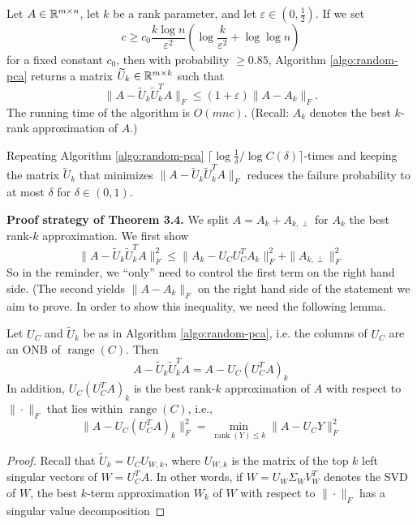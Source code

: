 \begin{theorem}
\begin{mdframed}
Let $A\in\mathbb{R}^{m\times n}$, let $k$ be a rank parameter, and let $\varepsilon\in (0,\frac{1}{2})$. If we set $$ c \geq c_0 \frac{k\log n}{\varepsilon^2} \left(
\log\frac{k}{\varepsilon^2} + \log \log n
\right)$$
for a fixed constant $c_0$, then with probability $\geq 0.85$, Algorithm \ref{algo:random-pca} returns a matrix $\widetilde{U}_k \in \mathbb{R}^{m\times k}$ such that
\begin{equation*}
\|A-\widetilde{U}_k\widetilde{U}_k^TA\|_F \leq (1+\varepsilon) \|A-A_k\|_F.
\end{equation*}
The running time of the algorithm is $O(mnc)$. (Recall: $A_k$ denotes the best $k$-rank approximation of $A$.)
\end{mdframed}
\begin{remark}
Repeating Algorithm \ref{algo:random-pca} $\lceil \log \frac{1}{\delta}/ \log C(\delta) \rceil$-times and keeping the matrix $\widetilde{U}_k$ that minimizes $\|A-\widetilde{U}_k\widetilde{U}_k^TA\|_F$ reduces the failure probability to at most $\delta$ for $\delta \in (0,1)$.
\end{remark}
\textbf{Proof strategy of Theorem 3.4.} We split $A = A_k + A_{k,\perp}$ for $A_k$ the best rank-$k$ approximation. We first show 
\begin{equation}
\|A-\widetilde{U}_k \widetilde{U}_k^T A \|_F^2 \leq \|A_k - U_CU_C^TA_k\|_F^2 + \|A_{k,\perp}\|_F^2
\end{equation}
So in the reminder, we ``only'' need to control the first term on the right hand side. (The second yields $\|A-A_k\|_F$ on the right hand side of the statement we aim to prove. In order to show this inequality, we need the following lemma.
\begin{lemma}
Let $U_C$ and $\widetilde{U}_k$ be as in Algorithm \ref{algo:random-pca}, i.e. the columns of $U_C$ are an ONB of $\operatorname{range}(C)$.  Then
\begin{equation}
A-\widetilde{U}_k\widetilde{U}_k^T A = A-U_C(U_C^TA)_k
\end{equation}
In addition, $U_C(U_C^TA)_k$ is the best rank-$k$ approximation of $A$ with respect to $\|\cdot\|_F$ that lies within $\operatorname{range}(C)$, i.e.,
\begin{equation} \label{lem:3.6-2}
\|A-U_C(U_C^TA)_k\|_F^2 = \min_{\operatorname{rank}(Y)\leq k} \|A-U_CY\|_F^2
\end{equation}
\begin{proof}
Recall that $\widetilde{U}_k = U_C U_{W,k}$, where $U_{W,k}$ is the matrix of the top $k$ left singular vectors of $W = U_C^TA$. In other words, if $W=U_W\Sigma_WV_W^T$ denotes the SVD of $W$, the best $k$-term approximation $W_k$ of $W$ with respect to $\|\cdot \|_F$ has a singular value decomposition

\end{proof}
\end{lemma}
\end{theorem}
